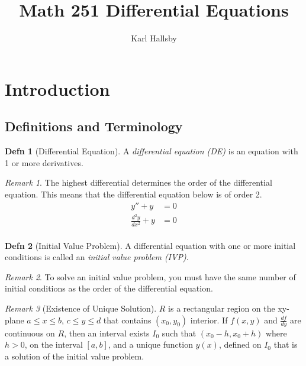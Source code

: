 \documentclass[10pt,letterpaper,final,twoside,notitlepage]{article}
\author{Karl Hallsby}
\title{Math 251 Differential Equations}
\theoremstyle{plain}
\theoremstyle{definition}
\newtheorem{definition}{Defn}
\theoremstyle{remark}
\newtheorem{remark}{Remark}[definition]
\begin{document}
\section{Introduction} \label{sec:Introduction}
	\subsection{Definitions and Terminology} \label{subsec:Definitions and Terminology}
		\begin{definition}[Differential Equation] \label{def:Differential Equation}
			A \emph{differential equation (DE)} is an equation with 1 or more derivatives.
			\begin{remark}
				The highest differential determines the order of the differential equation.
				This means that the differential equation below is of order 2.
				\begin{align*} 
					y'' + y &= 0 \\
					\frac{d^{2}y}{dx^{2}} + y &= 0 \\
				\end{align*} 
			\end{remark}
		\end{definition}
		\begin{definition}[Initial Value Problem] \label{def:Initial Value Problem}
			A differential equation with one or more initial conditions is called an \emph{initial value problem (IVP)}.
			\begin{remark}
				To solve an initial value problem, you must have the same number of initial conditions as the order of the differential equation.
			\end{remark}
			\begin{remark}[Existence of Unique Solution]
				$R$ is a rectangular region on the xy-plane $a \leq x \leq b$, $c \leq y \leq d$ that contains $\left( x_{0}, y_{0} \right)$ interior.
				If $f \left( x,y \right)$ and $\frac{df}{dy}$ are continuous on $R$, then an interval exists $I_{0}$ such that $\left( x_{0}-h, x_{0}+h \right)$ where $h>0$, on the interval $\left[ a,b \right]$, and a unique function $y \left( x \right)$, defined on $I_{0}$ that is a solution of the initial value problem.
			\end{remark}
		\end{definition}
	
\end{document}

